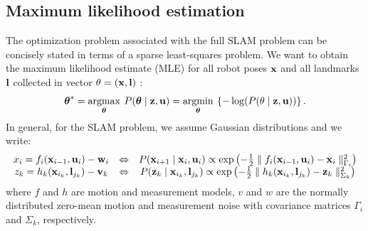 \documentclass{article}
\newcommand{\argmax}{\operatornamewithlimits{argmax}}
\newcommand{\argmin}{\operatornamewithlimits{argmin}}
\begin{document}
{\subsection{Maximum likelihood estimation}
The optimization problem associated with the full SLAM problem can be concisely stated in terms of a sparse least-squares problem. We want to obtain the maximum likelihood estimate (MLE) for all robot poses ${\bf x}$  and all landmarks ${\bf l}$  collected in vector $\theta=({\bf x},{\bf l})$ :
\begin{equation}
\boldsymbol{\theta}^{*}=\argmax_{\boldsymbol{\theta}}\: P(\boldsymbol{\theta}\mid{\bf z},{\bf u})=\argmin_{\boldsymbol{\theta}}\:\left\{ -\log(P(\theta\mid{\bf z},{\bf u}))\right\} . 
\label{eq:ML}
 \end{equation}
In general, for the SLAM problem, we assume Gaussian distributions and we write:
%
\begin{equation}
\begin{array}{ccc} 
x_i= f_{i}({\bf x}_{i-1},{\bf u}_{i})-{\bf w}_{i} & \Leftrightarrow  & P({\bf x}_{i+1}\mid{\bf x}_{i},{\bf u}_{i})\propto\exp\left(-\frac{1}{2}\parallel f_{i}({\bf x}_{i-1},{\bf u}_{i})-{\bf x}_{i}\parallel_{\Gamma_{i}}^{2}\right)\\
z_k=h_{k}({\bf x}_{i_{k}},{\bf l}_{j_{k}})-{\bf v}_{k}& \Leftrightarrow & P({\bf z}_{k}\mid{\bf x}_{i_{k}},{\bf l}_{j_{k}})\propto\exp\left(-\frac{1}{2}\parallel h_{k}({\bf x}_{i_{k}},{\bf l}_{j_{k}})-{\bf z}_{k}\parallel_{\Sigma_{k}}^{2}\right)
\end{array}
\end{equation} 
%
where $f$  and $h$  are motion and measurement models, $v$ and $w$ are the normally distributed zero-mean motion and measurement noise with covariance matrices $\Gamma_{i}$  and $\Sigma_{k}$, respectively.
%
}
\end{document}
